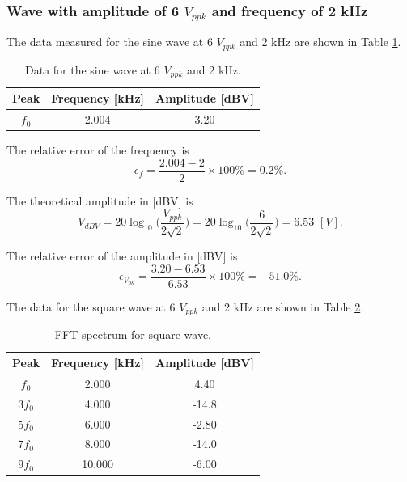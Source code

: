 \documentclass{article}
\begin{document}
\subsubsection{Wave with amplitude of 6 $V_{ppk}$ and frequency of 2 kHz}

The data measured for the sine wave at 6 $V_{ppk}$ and 2 kHz are shown in Table \ref{TableSine2}.

\begin{table}[H]\centering
    \begin{tabular}{ccc}
        \toprule
        Peak  & Frequency [kHz] & Amplitude [dBV] \\
        \midrule
        $f_0$ & 2.004           & 3.20            \\
        \bottomrule
    \end{tabular}
    \caption{Data for the sine wave at 6 $V_{ppk}$ and 2 kHz.}\label{TableSine2}
\end{table}

The relative error of the frequency is
$$\epsilon_f = \frac{2.004-2}{2}\times 100\% = 0.2\%.$$

The theoretical amplitude in [dBV] is
$$V_{dBV} = 20\log_{10}\bigg(\frac{V_{ppk}}{2\sqrt{2}}\bigg) = 20\log_{10}\bigg(\frac{6}{2\sqrt{2}}\bigg) = 6.53\,\,[V].$$

The relative error of the amplitude in [dBV] is
$$\epsilon_{V_{pk}} = \frac{3.20-6.53}{6.53}\times 100\% = -51.0\%.$$

The data for the square wave at 6 $V_{ppk}$ and 2 kHz are shown in Table \ref{TableSquare2}.

\begin{table}[H]\centering
    \begin{tabular}{ccc}
        \toprule
        Peak   & Frequency [kHz] & Amplitude [dBV] \\
        \midrule
        $f_0$  & 2.000           & 4.40            \\
        $3f_0$ & 4.000           & -14.8           \\
        $5f_0$ & 6.000           & -2.80           \\
        $7f_0$ & 8.000           & -14.0           \\
        $9f_0$ & 10.000          & -6.00           \\
        \bottomrule
    \end{tabular}
    \caption{FFT spectrum for square wave.}\label{TableSquare2}
\end{table}
\end{document}
